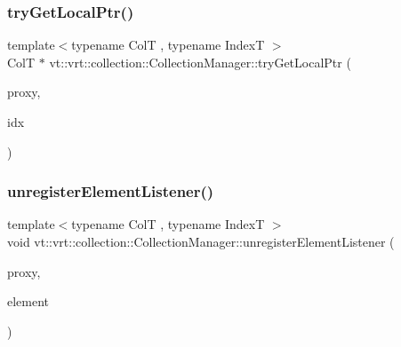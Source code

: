 \mbox{\label{structvt_1_1vrt_1_1collection_1_1_collection_manager_a09bd0e2b03bd5f638bdc44f7ffeef715}} 
\subsubsection{\texorpdfstring{try\+Get\+Local\+Ptr()}{tryGetLocalPtr()}}
{\footnotesize\ttfamily template$<$typename ColT , typename IndexT $>$ \\
ColT $\ast$ vt\+::vrt\+::collection\+::\+Collection\+Manager\+::try\+Get\+Local\+Ptr (\begin{DoxyParamCaption}\item[{\hyperlink{structvt_1_1vrt_1_1collection_1_1_collection_manager_a56458ed7f9bb22b631b9b3a745f42f94}{Collection\+Proxy\+Wrap\+Type}$<$ ColT, IndexT $>$ const \&}]{proxy,  }\item[{IndexT}]{idx }\end{DoxyParamCaption})}

\mbox{\label{structvt_1_1vrt_1_1collection_1_1_collection_manager_aecfd5c34b6d0b6781d3bb089ba1ae547}} 
\subsubsection{\texorpdfstring{unregister\+Element\+Listener()}{unregisterElementListener()}}
{\footnotesize\ttfamily template$<$typename ColT , typename IndexT $>$ \\
void vt\+::vrt\+::collection\+::\+Collection\+Manager\+::unregister\+Element\+Listener (\begin{DoxyParamCaption}\item[{\hyperlink{namespacevt_a1b417dd5d684f045bb58a0ede70045ac}{Virtual\+Proxy\+Type}}]{proxy,  }\item[{int}]{element }\end{DoxyParamCaption})}




